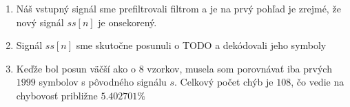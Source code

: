 \documentclass[10pt, a4paper, twocolumn]{article}
\begin{document}
\begin{enumerate}[leftmargin=*]
\item Náš vstupný signál sme prefiltrovali filtrom a je na prvý pohľad je zrejmé, že nový signál $ss[n]$ je onsekorený.
\begin{figure}[H]
\centering
{}
\end{figure}

\item Signál $ss[n]$ sme skutočne posunuli o TODO a dekódovali jeho symboly
\begin{figure}[H]
\centering
{}
\end{figure}

\item Keďže bol posun väčší ako o 8 vzorkov, musela som porovnávať iba prvých $1999$ symbolov s pôvodného signálu $s$. Celkový počet chýb je $108$, čo vedie na chybovosť približne $5.402701 \%$


\end{enumerate}
\end{document}
